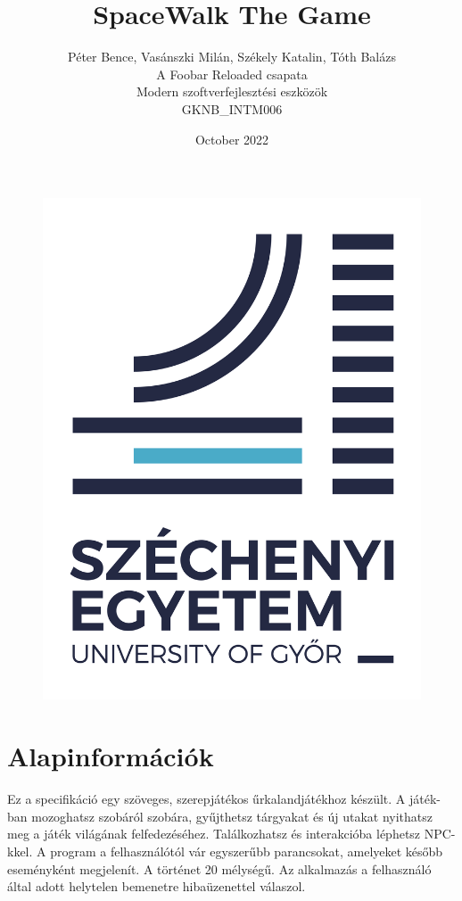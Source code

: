 \documentclass{scrarticle}
\title{SpaceWalk The Game}
\author{Péter Bence, Vasánszki Milán, Székely Katalin, Tóth Balázs\\A Foobar Reloaded csapata\\Modern szoftverfejlesztési eszközök\\GKNB\_INTM006}
\date{October 2022}
\begin{document}
\maketitle
\begin{figure}[H]\centering
    \includegraphics[width=0.4\columnwidth]{sze_logo.png}\label{fig:logo}
\end{figure}
\newpage
\tableofcontents
\newpage

\section{Alapinformációk} 
Ez a specifikáció egy szöveges, szerepjátékos űrkalandjátékhoz készült. A játék- ban mozoghatsz szobáról szobára, gyűjthetsz tárgyakat és új utakat nyithatsz meg a játék világának felfedezéséhez. Találkozhatsz és interakcióba léphetsz NPC-kkel. A program a felhasználótól vár egyszerűbb parancsokat, amelyeket később eseményként megjelenít. A történet 20 mélységű. Az alkalmazás a felhasználó által adott helytelen bemenetre hibaüzenettel válaszol.
\end{document}
